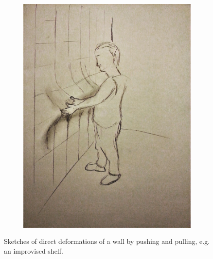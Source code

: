 \begin{figure}[h]
\begin{subfigure}[t]{.44\textwidth}
    \includegraphics[width=\linewidth]{figures/jamming/concepts/impro/pull}
  \end{subfigure}
  \caption{Sketches of direct deformations of a wall by pushing and pulling, e.g. an improvised shelf.}
\label{fig:ch:jamming:concepts:impro}
\end{figure}


